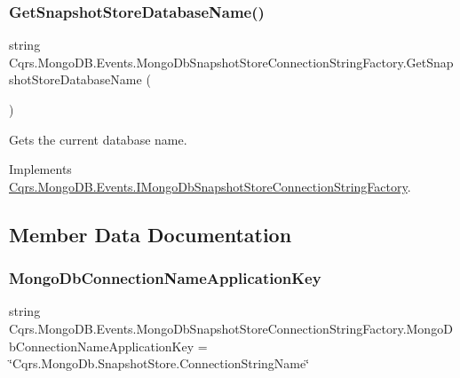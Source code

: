 \subsubsection{\texorpdfstring{Get\+Snapshot\+Store\+Database\+Name()}{GetSnapshotStoreDatabaseName()}}
{\footnotesize\ttfamily string Cqrs.\+Mongo\+D\+B.\+Events.\+Mongo\+Db\+Snapshot\+Store\+Connection\+String\+Factory.\+Get\+Snapshot\+Store\+Database\+Name (\begin{DoxyParamCaption}{ }\end{DoxyParamCaption})}



Gets the current database name. 



Implements \hyperlink{interfaceCqrs_1_1MongoDB_1_1Events_1_1IMongoDbSnapshotStoreConnectionStringFactory_ab04ecd4d9529dca4ea648d38cb5d4b78_ab04ecd4d9529dca4ea648d38cb5d4b78}{Cqrs.\+Mongo\+D\+B.\+Events.\+I\+Mongo\+Db\+Snapshot\+Store\+Connection\+String\+Factory}.



\subsection{Member Data Documentation}
\mbox{\label{classCqrs_1_1MongoDB_1_1Events_1_1MongoDbSnapshotStoreConnectionStringFactory_a84a0a9bfa7319b87dde12633e2e0c364_a84a0a9bfa7319b87dde12633e2e0c364}} 
\subsubsection{\texorpdfstring{Mongo\+Db\+Connection\+Name\+Application\+Key}{MongoDbConnectionNameApplicationKey}}
{\footnotesize\ttfamily string Cqrs.\+Mongo\+D\+B.\+Events.\+Mongo\+Db\+Snapshot\+Store\+Connection\+String\+Factory.\+Mongo\+Db\+Connection\+Name\+Application\+Key = \char`\"{}Cqrs.\+Mongo\+Db.\+Snapshot\+Store.\+Connection\+String\+Name\char`\"{}\hspace{0.3cm}{\ttfamily [static]}}



